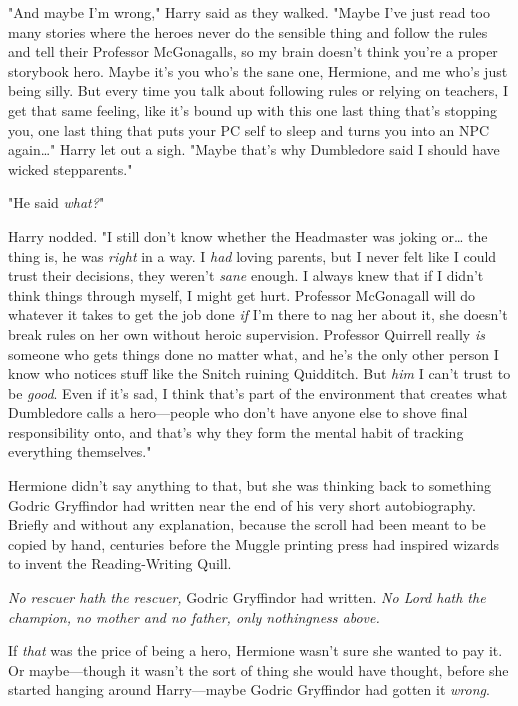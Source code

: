 "And maybe I'm wrong," Harry said as they walked. "Maybe I've just read too 
many stories where the heroes never do the sensible thing and follow the rules 
and tell their Professor McGonagalls, so my brain doesn't think you're a proper 
storybook hero. Maybe it's you who's the sane one, Hermione, and me who's just 
being silly. But every time you talk about following rules or relying on 
teachers, I get that same feeling, like it's bound up with this one last thing 
that's stopping you, one last thing that puts your PC self to sleep and turns 
you into an NPC again{\ldots}" Harry let out a sigh. "Maybe that's why 
Dumbledore said I should have wicked stepparents."

"He said \emph{what?}"

Harry nodded. "I still don't know whether the Headmaster was joking or{\ldots} 
the thing is, he was \emph{right} in a way. I \emph{had} loving parents, but I 
never felt like I could trust their decisions, they weren't \emph{sane} enough. 
I always knew that if I didn't think things through myself, I might get hurt. 
Professor McGonagall will do whatever it takes to get the job done \emph{if} 
I'm there to nag her about it, she doesn't break rules on her own without 
heroic supervision. Professor Quirrell really \emph{is} someone who gets things 
done no matter what, and he's the only other person I know who notices stuff 
like the Snitch ruining Quidditch. But\emph{ him} I can't trust to be 
\emph{good}. Even if it's sad, I think that's part of the environment that 
creates what Dumbledore calls a hero---people who don't have anyone else to 
shove final responsibility onto, and that's why they form the mental habit of 
tracking everything themselves."

Hermione didn't say anything to that, but she was thinking back to something 
Godric Gryffindor had written near the end of his very short autobiography. 
Briefly and without any explanation, because the scroll had been meant to be 
copied by hand, centuries before the Muggle printing press had inspired wizards 
to invent the Reading-Writing Quill.

\emph{No rescuer hath the rescuer,} Godric Gryffindor had written. \emph{No 
Lord hath the champion, no mother and no father, only nothingness above.}

If \emph{that} was the price of being a hero, Hermione wasn't sure she wanted 
to pay it. Or maybe---though it wasn't the sort of thing she would have 
thought, before she started hanging around Harry---maybe Godric Gryffindor had 
gotten it \emph{wrong}.

